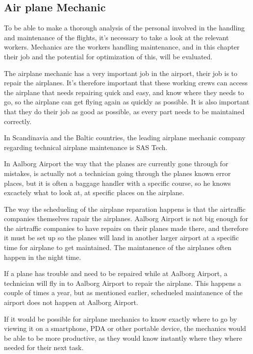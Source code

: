 \subsection{Air plane Mechanic}
To be able to make a thorough analysis of the personal involved in the handling and maintenance of the flights, it's necessary to take a look at the relevant workers. Mechanics are the workers handling maintenance, and in this chapter their job and the potential for optimization of this, will be evaluated.

The airplane mechanic has a very important job in the airport, their job is to repair the airplanes. It's therefore important that these working crews can access the airplane that needs repairing quick and easy, and know where they needs to go, so the airplane can get flying again as quickly as possible. It is also important that they do their job as good as possible, as every part needs to be maintained correctly.

In Scandinavia and the Baltic countries, the leading airplane mechanic company regarding technical airplane maintenance is SAS Tech\cite{sas_tech_mechanic}.

In Aalborg Airport the way that the planes are currently gone through for mistakes, is actually not a technician going through the planes known error places, but it is often a baggage handler with a specific course, so he knows excactely what to look at, at specific places on the airplane.

The way the schedueling of the airplane reparation happens is that the airtraffic companies themselves rapair the airplanes. Aalborg Airport is not big enough for the airtraffic companies to have repairs on their planes made there, and therefore it must be set up so the planes will land in another larger airport at a specific time for airplane to get maintained. The maintanence of the airplanes often happen in the night time.

If a plane has trouble and need to be repaired while at Aalborg Airport, a technician will fly in to Aalborg Airport to repair the airplane. This happens a couple of times a year, but as mentioned earlier, schedueled maintanence of the airport does not happen at Aalborg Airport.

If it would be possible for airplane mechanics to know exactly where to go by viewing it on a smartphone, PDA or other portable device, the mechanics would be able to be more productive, as they would know instantly where they where needed for their next task. 


